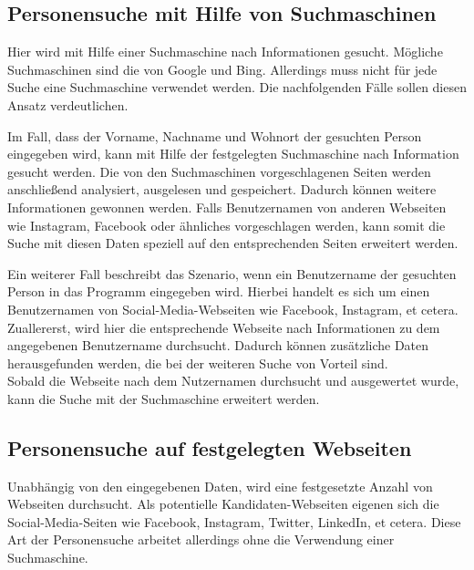 	\subsection{Personensuche mit Hilfe von Suchmaschinen}
	\label{subsubsec:PersonensucheMitHilfevonSuchmaschine}
	Hier wird mit Hilfe einer Suchmaschine nach Informationen gesucht. Mögliche Suchmaschinen sind die von Google und Bing. Allerdings muss nicht für jede Suche eine Suchmaschine verwendet werden. Die nachfolgenden Fälle sollen diesen Ansatz verdeutlichen.
	
	Im Fall, dass der Vorname, Nachname und Wohnort der gesuchten Person eingegeben wird, kann mit Hilfe der festgelegten Suchmaschine nach Information gesucht werden. Die von den Suchmaschinen vorgeschlagenen Seiten werden anschließend analysiert, ausgelesen und gespeichert. Dadurch können weitere Informationen gewonnen werden. Falls Benutzernamen von anderen Webseiten wie Instagram, Facebook oder ähnliches vorgeschlagen werden, kann somit die Suche mit diesen Daten speziell auf den entsprechenden Seiten erweitert werden.
	
	Ein weiterer Fall beschreibt das Szenario, wenn ein Benutzername der gesuchten Person in das Programm eingegeben wird. Hierbei handelt es sich um einen Benutzernamen von Social-Media-Webseiten wie Facebook, Instagram, et cetera. \\
	Zuallererst, wird hier die entsprechende Webseite nach Informationen zu dem angegebenen Benutzername durchsucht. Dadurch können zusätzliche Daten herausgefunden werden, die bei der weiteren Suche von Vorteil sind.\\
	Sobald die Webseite nach dem Nutzernamen durchsucht und ausgewertet wurde, kann die Suche mit der Suchmaschine erweitert werden.
	
	\subsection{Personensuche auf festgelegten Webseiten}
	\label{subsubsec:PersonensucheohneSuchmaschine}
	Unabhängig von den eingegebenen Daten, wird eine festgesetzte Anzahl von Webseiten durchsucht. Als potentielle Kandidaten-Webseiten eigenen sich die Social-Media-Seiten wie Facebook, Instagram, Twitter, LinkedIn, et cetera. Diese Art der Personensuche arbeitet allerdings ohne die Verwendung einer Suchmaschine.
	
